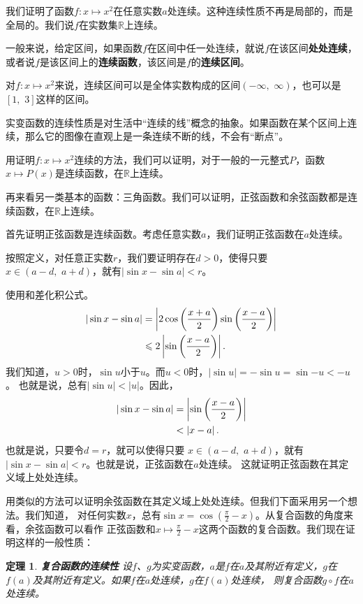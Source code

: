 \documentclass[12pt,UTF8]{ctexbook}
\newtheorem{tm}{定理}[section]
\begin{document}
我们证明了函数$f:x\mapsto x^2$在任意实数$a$处连续。这种连续性质不再是局部的，而是全局的。我们说$f$在实数集$\mathbb{R}$上连续。

一般来说，给定区间，如果函数$f$在区间中任一处连续，就说$f$在该区间\textbf{处处连续}，或者说$f$是该区间上的\textbf{连续函数}，该区间是$f$的\textbf{连续区间}。

对$f:x\mapsto x^2$来说，连续区间可以是全体实数构成的区间$(-\infty,\,\,\infty)$，也可以是$[1,\,\, 3]$这样的区间。

实变函数的连续性质是对生活中“连续的线”概念的抽象。如果函数在某个区间上连续，那么它的图像在直观上是一条连续不断的线，不会有“断点”。

用证明$f:x\mapsto x^2$连续的方法，我们可以证明，对于一般的一元整式$P$，函数$x\mapsto P(x)$是连续函数，在$\mathbb{R}$上连续。

再来看另一类基本的函数：三角函数。我们可以证明，正弦函数和余弦函数都是连续函数，在$\mathbb{R}$上连续。

首先证明正弦函数是连续函数。考虑任意实数$a$，我们证明正弦函数在$a$处连续。

按照定义，对任意正实数$r$，我们要证明存在$d>0$，使得只要
$x\in(a-d,\,\,a+d)$，就有$|\sin{x} - \sin{a}| < r$。

使用和差化积公式。
\begin{align}
    |\sin{x} - \sin{a}| &= \left|2\cos\left(\frac{x+a}{2}\right)\sin\left(\frac{x-a}{2}\right)\right| \notag \\
    &\leqslant 2 \left|\sin\left(\frac{x-a}{2}\right)\right|. \notag
\end{align}
我们知道，$u>0$时，$\sin{u}$小于$u$。而$u<0$时，$|\sin{u}| = -\sin{u} = \sin{-u} < -u$。
也就是说，总有$|\sin{u}| < |u|$。因此，
\begin{align}
    |\sin{x} - \sin{a}| &= \left|\sin\left(\frac{x-a}{2}\right)\right| \notag \\
    &<  \left|x-a\right|. \notag
\end{align}
也就是说，只要令$d = r$，就可以使得只要
$x\in(a-d,\,\,a+d)$，就有$|\sin{x} - \sin{a}| < r$。也就是说，正弦函数在$a$处连续。
这就证明正弦函数在其定义域上处处连续。

用类似的方法可以证明余弦函数在其定义域上处处连续。但我们下面采用另一个想法。我们知道，
对任何实数$x$，总有$\sin{x} = \cos{\left(\frac{\pi}{2} - x\right)}$。从复合函数的角度来看，余弦函数可以看作
正弦函数和$x\mapsto \frac{\pi}{2} - x$这两个函数的复合函数。我们现在证明这样的一般性质：

\begin{tm}{\textbf{复合函数的连续性}}
    设$f$、$g$为实变函数，$a$是$f$在$a$及其附近有定义，$g$在$f(a)$及其附近有定义。如果$f$在$a$处连续，$g$在$f(a)$处连续，
    则复合函数$g\circ f$在$a$处连续。
\end{tm}
\end{document}
